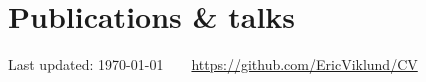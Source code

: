 \documentclass[11pt]{article} %
\begin{document}

\section*{Publications \& talks}

\nocite{*}
\printbibliography[heading=none]




\begin{center}
	\scriptsize
	Last updated: \today~~\raisebox{-0.5pt}{\textbullet}~~\href{https://github.com/EricViklund/CV}{https://github.com/EricViklund/CV}
\end{center}

\end{document}
